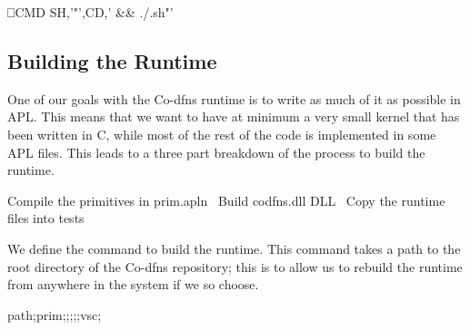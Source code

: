 \documentclass{article}%
\begin{document}
⎕CMD SH,'"',CD,' && ./.sh"'
\eatline
{}\nwendcode{}\nwdocspar
\subsection{Building the Runtime}

One of our goals with the Co-dfns runtime is to write as much of it
as possible in APL.
This means that we want to have at minimum a very small kernel that
has been written in C,
while most of the rest of the code is implemented in some APL files.
This leads to a three part breakdown of the process to
build the runtime.

\nwenddocs{}\endmoddef\nwstartdeflinemarkup{}\nwenddeflinemarkup
\LA{}Compile the primitives in \code{}prim.apln\edoc{}~{\nwtagstyle{}}\RA{}
\LA{}Build \code{}codfns.dll\edoc{} DLL~{\nwtagstyle{}}\RA{}
\LA{}Copy the runtime files into \code{}tests{\nwbackslash}\edoc{}~{\nwtagstyle{}}\RA{}
\nwendcode{}\nwdocspar

We define the command {\Tt{}\nwendquote} to build the runtime.
This command takes a path to the root directory of the Co-dfns
repository; this is to allow us to rebuild the runtime from anywhere
in the system if we so choose.

\nwenddocs{}\endmoddef\nwstartdeflinemarkup\nwenddeflinemarkup
{} path;prim;;;;;vsc;
\end{document}
